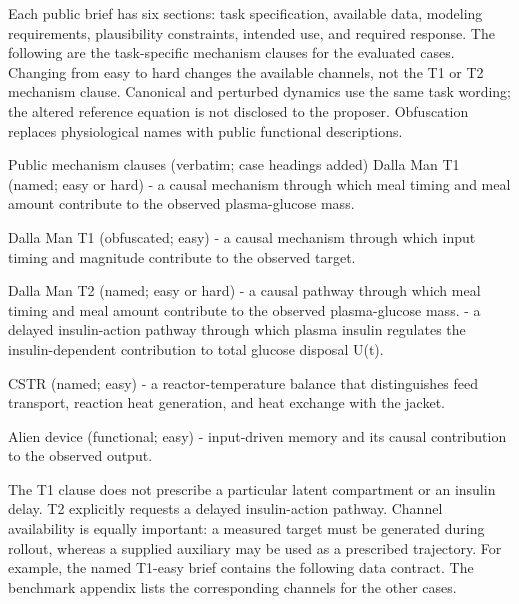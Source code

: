 Each public brief has six sections: task specification, available data, modeling
requirements, plausibility constraints, intended use, and required response.
The following are the task-specific mechanism clauses for the evaluated cases.
Changing from easy to hard changes the available channels, not the T1 or T2
mechanism clause. Canonical and perturbed dynamics use the same task wording;
the altered reference equation is not disclosed to the proposer. Obfuscation
replaces physiological names with public functional descriptions.

\begin{afpromptbox}{Public mechanism clauses (verbatim; case headings added)}
Dalla Man T1 (named; easy or hard)
- a causal mechanism through which meal timing and meal amount contribute to
the observed plasma-glucose mass.

Dalla Man T1 (obfuscated; easy)
- a causal mechanism through which input timing and magnitude contribute to
the observed target.

Dalla Man T2 (named; easy or hard)
- a causal pathway through which meal timing and meal amount contribute to
the observed plasma-glucose mass.
- a delayed insulin-action pathway through which plasma insulin regulates
the insulin-dependent contribution to total glucose disposal U(t).

CSTR (named; easy)
- a reactor-temperature balance that distinguishes feed transport, reaction
heat generation, and heat exchange with the jacket.

Alien device (functional; easy)
- input-driven memory and its causal contribution to the observed output.
\end{afpromptbox}

The T1 clause does not prescribe a particular latent compartment or an insulin
delay. T2 explicitly requests a delayed insulin-action pathway. Channel availability
is equally important: a measured target must be generated during rollout, whereas
a supplied auxiliary may be used as a prescribed trajectory. For example, the
named T1-easy brief contains the following data contract. The benchmark appendix
lists the corresponding channels for the other cases.

